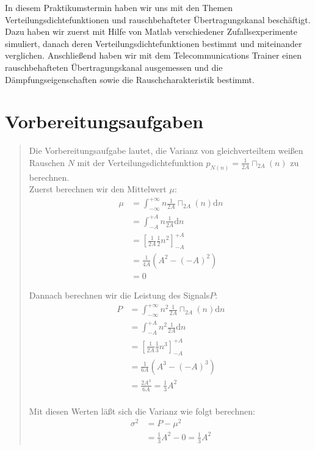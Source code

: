     In diesem Praktikumstermin haben wir uns mit den Themen Verteilungsdichtefunktionen und rauschbehafteter
    Übertragungskanal beschäftigt. Dazu haben wir zuerst mit Hilfe von Matlab verschiedener Zufallsexperimente
    simuliert, danach deren Verteilungsdichtefunktionen bestimmt und miteinander verglichen.
    Anschließend haben wir mit dem Telecommunications Trainer einen rauschbehafteten Übertragungskanal ausgemessen und
    die Dämpfungseigenschaften sowie die Rauschcharakteristik bestimmt.


\section{Vorbereitungsaufgaben}

    \begin{quote}
    Die Vorbereitungsaufgabe lautet, die Varianz von gleichverteiltem weißen Rauschen $N$ mit der
    Verteilungsdichtefunktion $p_{N(n)} = \frac{1}{2A} \sqcap_{2A} (n)$ zu berechnen.\\
    Zuerst berechnen wir den Mittelwert $\mu$:
   	\begin{equation*}
    	\begin{split}
    		\mu &= \int_{-\infty}^{+\infty} n \frac{1}{2A} \sqcap_{2A} (n) \mathrm dn\\
    		&= \int_{-A}^{+A} n \frac{1}{2A} \mathrm dn\\
    		&= \left[ \frac{1}{2A} \frac{1}{2} n^2 \right]_{-A}^{+A}\\
    		&= \frac{1}{4A} (A^2-(-A)^2)\\
    		&= 0
    	\end{split}
    \end{equation*}
    
    Dannach berechnen wir die Leistung des Signals$P$:\\
    \begin{equation*}
    	\begin{split}
    		P &= \int_{-\infty}^{+\infty} n^2 \frac{1}{2A} \sqcap_{2A} (n) \mathrm dn\\
    		&= \int_{-A}^{+A} n^2 \frac{1}{2A} \mathrm dn\\
    		&= \left[ \frac{1}{2A} \frac{1}{3} n^3 \right]_{-A}^{+A}\\
    		&= \frac{1}{6A} (A^3-(-A)^3)\\
            &= \frac{2A^3}{6A} = \frac{1}{3} A^2\\
    	\end{split}
    \end{equation*}
    
    Mit diesen Werten läßt sich die Varianz wie folgt berechnen:
    \begin{equation*}
    	\begin{split}
    		\sigma^2 &= P - \mu^2\\
    		&= \frac{1}{3} A^2 - 0 = \frac{1}{3} A^2
    	\end{split}
    \end{equation*}
	\end{quote}
         	


